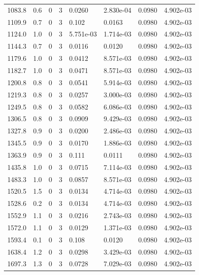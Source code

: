 \documentclass[preview]{standalone}
\begin{document}
{{{{\begin{tabular}{L{1.2cm}C{1.2cm} C{0.3cm}C{0.5cm} C{1.4cm}C{1.4cm} C{1.4cm}C{1.4cm}}
  1083.8  &   0.6  & 0     &  3 &  0.0260  & 2.830e-04  & 0.0980 &  4.902e-03   \\ 
  1109.9  &   0.7  & 0     &  3 &  0.102  & 0.0163  & 0.0980 &  4.902e-03   \\ 
  1124.0  &   1.0  & 0     &  3 &  5.751e-03  & 1.714e-03  & 0.0980 &  4.902e-03   \\ 
  1144.3  &   0.7  & 0     &  3 &  0.0116  & 0.0120  & 0.0980 &  4.902e-03   \\ 
  1179.6  &   1.0  & 0     &  3 &  0.0412  & 8.571e-03  & 0.0980 &  4.902e-03   \\ 
  1182.7  &   1.0  & 0     &  3 &  0.0471  & 8.571e-03  & 0.0980 &  4.902e-03   \\ 
  1200.8  &   0.8  & 0     &  3 &  0.0541  & 5.914e-03  & 0.0980 &  4.902e-03   \\ 
  1219.3  &   0.8  & 0     &  3 &  0.0257  & 3.000e-03  & 0.0980 &  4.902e-03   \\ 
  1249.5  &   0.8  & 0     &  3 &  0.0582  & 6.086e-03  & 0.0980 &  4.902e-03   \\ 
  1306.5  &   0.8  & 0     &  3 &  0.0909  & 9.429e-03  & 0.0980 &  4.902e-03   \\ 
  1327.8  &   0.9  & 0     &  3 &  0.0200  & 2.486e-03  & 0.0980 &  4.902e-03   \\ 
  1345.5  &   0.9  & 0     &  3 &  0.0170  & 1.886e-03  & 0.0980 &  4.902e-03   \\ 
  1363.9  &   0.9  & 0     &  3 &  0.111  & 0.0111  & 0.0980 &  4.902e-03   \\ 
  1435.8  &   1.0  & 0     &  3 &  0.0715  & 7.114e-03  & 0.0980 &  4.902e-03   \\ 
  1483.3  &   1.0  & 0     &  3 &  0.0857  & 8.571e-03  & 0.0980 &  4.902e-03   \\ 
  1520.5  &   1.5  & 0     &  3 &  0.0134  & 4.714e-03  & 0.0980 &  4.902e-03   \\ 
  1528.6  &   0.2  & 0     &  3 &  0.0134  & 4.714e-03  & 0.0980 &  4.902e-03   \\ 
  1552.9  &   1.1  & 0     &  3 &  0.0216  & 2.743e-03  & 0.0980 &  4.902e-03   \\ 
  1572.0  &   1.1  & 0     &  3 &  0.0129  & 1.371e-03  & 0.0980 &  4.902e-03   \\ 
  1593.4  &   0.1  & 0     &  3 &  0.108  & 0.0120  & 0.0980 &  4.902e-03   \\ 
  1638.4  &   1.2  & 0     &  3 &  0.0298  & 3.429e-03  & 0.0980 &  4.902e-03   \\ 
  1697.3  &   1.3  & 0     &  3 &  0.0728  & 7.029e-03  & 0.0980 &  4.902e-03   \\ 

\end{tabular}}}}}
\end{document}
